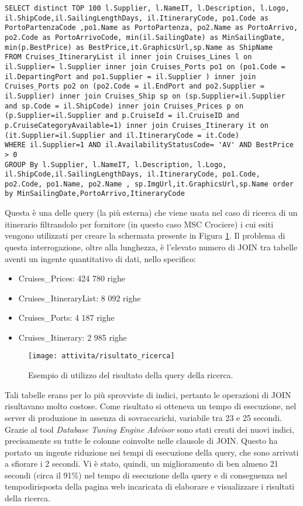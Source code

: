 \begin{lstlisting}
SELECT distinct TOP 100 l.Supplier, l.NameIT, l.Description, l.Logo, il.ShipCode,il.SailingLengthDays, il.ItineraryCode, po1.Code as PortoPartenzaCode ,po1.Name as PortoPartenza, po2.Name as PortoArrivo, po2.Code as PortoArrivoCode, min(il.SailingDate) as MinSailingDate, min(p.BestPrice) as BestPrice,it.GraphicsUrl,sp.Name as ShipName 
FROM Cruises_ItineraryList il inner join Cruises_Lines l on il.Supplier= l.Supplier inner join Cruises_Ports po1 on (po1.Code = il.DepartingPort and po1.Supplier = il.Supplier ) inner join Cruises_Ports po2 on (po2.Code = il.EndPort and po2.Supplier = il.Supplier) inner join Cruises_Ship sp on (sp.Supplier=il.Supplier and sp.Code = il.ShipCode) inner join Cruises_Prices p on (p.Supplier=il.Supplier and p.CruiseId = il.CruiseID and p.CruiseCategoryAvailable=1) inner join Cruises_Itinerary it on (it.Supplier=il.Supplier and il.ItineraryCode = it.Code) 
WHERE il.Supplier=1 AND il.AvailabilityStatusCode= 'AV' AND BestPrice > 0 
GROUP By l.Supplier, l.NameIT, l.Description, l.Logo, il.ShipCode,il.SailingLengthDays, il.ItineraryCode, po1.Code, po2.Code, po1.Name, po2.Name , sp.ImgUrl,it.GraphicsUrl,sp.Name order by MinSailingDate,PortoArrivo,ItineraryCode
\end{lstlisting}
Questa è una delle query (la più esterna) che viene usata nel caso di ricerca di un itinerario filtrandolo per fornitore (in questo caso MSC Crociere) i cui esiti vengono utilizzati per creare la schermata presente in Figura \ref{figura:query-1}. Il problema di questa interrogazione, oltre alla lunghezza, è l'elevato numero di JOIN tra tabelle aventi un ingente quantitativo di dati, nello specifico:
\begin{itemize}
	\item Cruises\_Prices: 424 780 righe
	\item Cruises\_ItineraryList: 8 092 righe
	\item Cruises\_Ports: 4 187 righe
	\item Cruises\_Itinerary: 2 985 righe
\end{itemize}
\begin{figure}[!h] 
	\centering 
	\texttt{[image: attivita/risultato\_ricerca]} 
	\caption{Esempio di utilizzo del risultato della query della ricerca.}
	\label{figura:query-1}
\end{figure}
Tali tabelle erano per lo più sprovviste di indici, pertanto le operazioni di JOIN risultavano molto costose. Come risultato si otteneva un tempo di esecuzione, nel server di produzione in assenza di sovraccarichi, variabile tra 23 e 25 secondi. Grazie al tool \textit{Database Tuning Engine Advisor} sono stati creati dei nuovi indici, precisamente su tutte le colonne coinvolte nelle clausole di JOIN. Questo ha portato un ingente riduzione nei tempi di esecuzione della query, che sono arrivati a sfiorare i 2 secondi. Vi è stato, quindi, un miglioramento di ben almeno 21 secondi (circa il 91\%) nel tempo di esecuzione della query e di conseguenza nel \gls{tempodirisposta} della pagina web incaricata di elaborare e visualizzare i risultati della ricerca.\\


